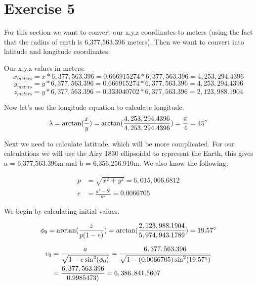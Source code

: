 \documentclass{article}
\begin{document}
\section*{Exercise 5}

For this section we want to convert our x,y,z coordinates to meters (using the fact that the radius of earth is 6,377,563.396 meters).  Then we want to convert into latitude and longitude coordinates.
\vspace{5mm}

\noindent Our x,y,z values in meters:
\begin{equation*}
    x_{meters} = x * 6,377,563.396 = 0.666915274 * 6,377,563.396 = {4,253,294.4396}
\end{equation*} 
\begin{equation*}
    y_{meters} = y * 6,377,563.396 = 0.666915274 * 6,377,563.396 = {4,253,294.4396}
\end{equation*} 
\begin{equation*}
    z_{meters} = y * 6,377,563.396 = 0.333040702 * 6,377,563.396 = {2,123,988.1904}
\end{equation*} 

\vspace{5mm}
\noindent Now let's use the longitude equation to calculate longitude.
\begin{equation*}
    \lambda = \arctan(\frac{x}{y}) = \arctan(\frac{4,253,294.4396}{4,253,294.4396}) = \frac{\pi}{4} = 45\degree
\end{equation*} 

\vspace{5mm}
\noindent Next we need to calculate latitude, which will be more complicated.  For our calculations we
will use the Airy 1830 ellipsoidal to represent the Earth, this gives a = 6,377,563.396m and
b = 6,356,256.910m.  We also know the following:

\begin{align*}
    p & = \sqrt{x^{2} + y^{2}} = 6,015,066.6812 \\  e & = \frac{a^{2} - b^{2}}{a^{2}} = 0.0066705 
\end{align*} 

\noindent We begin by calculating initial values.

\begin{align*}
    \phi_0  = \arctan(\frac{z}{p(1-e)})  = \arctan(\frac{2,123,988.1904}{5,974,943.1789}) = 19.57\degree
\end{align*} 

\begin{align*}
    v_0 & = \frac{a}{\sqrt{1 - e\sin^{2}(\phi_0)}} = \frac{6,377,563.396}{\sqrt{1 - (0.0066705)\sin^{2}(19.57\degree)}} \\ & = \frac{6,377,563.396}{0.9985473)} = 6,386,841.5607
\end{align*} 
\end{document}
